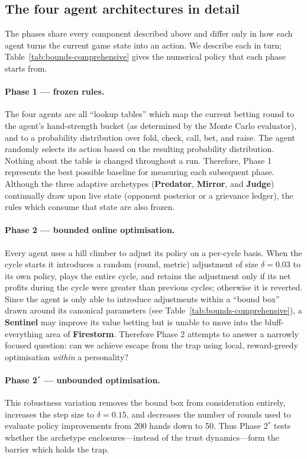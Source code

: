 \documentclass[10pt]{article} %
\newcommand{\arch}[1]{\textbf{#1}}
\begin{document}
\subsection{The four agent architectures in detail}
The phases share every component described above and differ only in
how each agent turns the current game state into an action. We
describe each in turn; Table~\ref{tab:bounds-comprehensive} gives the
numerical policy that each phase starts from.

\paragraph{Phase 1 --- frozen rules.} The four agents are all ``lookup tables'' which map the current betting
round to the agent's hand-strength bucket (as determined by the Monte Carlo
evaluator), and to a probability distribution over fold, check, call, bet, and
raise. The agent randomly selects its action based on the resulting probability
distribution. Nothing about the table is changed throughout a run. Therefore,
Phase 1 represents the best possible baseline for measuring each subsequent
phase. Although the three adaptive archetypes (\arch{Predator}, \arch{Mirror},
and \arch{Judge}) continually draw upon live state (opponent posterior or a
grievance ledger), the rules which consume that state are also frozen.

\paragraph{Phase 2 --- bounded online optimisation.} Every agent uses a hill climber to adjust its policy on a per-cycle basis.
When the cycle starts it introduces a random (round, metric) adjustment of size
$\delta = 0.03$ to its own policy, plays the entire cycle, and retains the
adjustment only if its net profits during the cycle were greater than previous
cycles; otherwise it is reverted. Since the agent is only able to introduce
adjustments within a ``bound box'' drawn around its canonical parameters (see
Table~\ref{tab:bounds-comprehensive}), a \arch{Sentinel} may improve its
value betting but is unable to move into the bluff-everything area of
\arch{Firestorm}. Therefore Phase 2 attempts to answer a narrowly focused
question: can we achieve escape from the trap using local, reward-greedy
optimisation \emph{within} a personality?

\paragraph{Phase 2$^{*}$ --- unbounded optimisation.} This robustness variation removes the bound box from consideration entirely,
increases the step size to $\delta = 0.15$, and decreases the number of rounds
used to evaluate policy improvements from 200 hands down to 50. Thus
Phase 2$^{*}$ tests whether the archetype enclosures---instead of the trust
dynamics---form the barrier which holds the trap.
\end{document}
